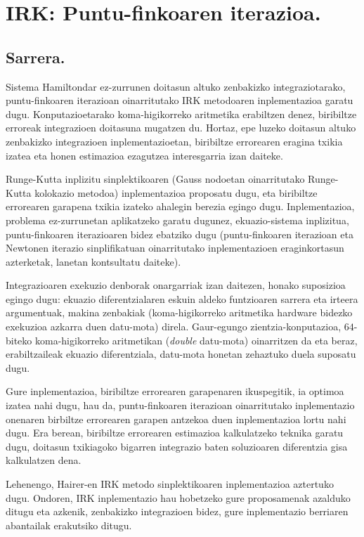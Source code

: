 \chapter{IRK: Puntu-finkoaren iterazioa.}
\label{chap:IRK-PF}

\section{Sarrera.}


Sistema Hamiltondar ez-zurrunen doitasun altuko zenbakizko integraziotarako, puntu-finkoaren iterazioan oinarritutako IRK metodoaren inplementazioa garatu dugu. Konputazioetarako koma-higikorreko aritmetika erabiltzen denez, biribiltze erroreak integrazioen doitasuna mugatzen du. Hortaz, epe luzeko doitasun altuko zenbakizko integrazioen inplementazioetan, biribiltze errorearen eragina txikia izatea eta honen estimazioa ezagutzea interesgarria izan daiteke. 

Runge-Kutta inplizitu sinplektikoaren (Gauss nodoetan oinarritutako Runge-Kutta kolokazio metodoa) inplementazioa proposatu dugu, eta biribiltze errorearen garapena txikia izateko ahalegin berezia egingo dugu. Inplementazioa, problema ez-zurrunetan aplikatzeko garatu dugunez, ekuazio-sistema inplizitua, puntu-finkoaren iterazioaren bidez ebatziko dugu (puntu-finkoaren iterazioan eta Newtonen iterazio sinplifikatuan oinarritutako inplementazioen eraginkortasun azterketak, \cite{Hairer2006,JMSanz-Serna1994} lanetan kontsultatu daiteke).

Integrazioaren exekuzio denborak onargarriak izan daitezen, honako suposizioa egingo dugu: ekuazio diferentzialaren eskuin aldeko funtzioaren sarrera eta irteera argumentuak, makina zenbakiak (koma-higikorreko aritmetika hardware bidezko exekuzioa azkarra duen datu-mota) direla. Gaur-egungo zientzia-konputazioa,  $64$-biteko koma-higikorreko aritmetikan (\emph{double} datu-mota) oinarritzen da eta beraz, erabiltzaileak ekuazio diferentziala, datu-mota honetan zehaztuko duela suposatu dugu.

Gure inplementazioa, biribiltze errorearen garapenaren ikuspegitik, ia optimoa izatea nahi dugu, hau da, puntu-finkoaren iterazioan oinarritutako inplementazio onenaren birbiltze errorearen garapen antzekoa duen inplementazioa lortu nahi dugu. Era berean, biribiltze errorearen estimazioa kalkulatzeko teknika garatu dugu, doitasun txikiagoko bigarren integrazio baten soluzioaren diferentzia gisa kalkulatzen dena. 
 
 
Lehenengo, Hairer-en IRK metodo sinplektikoaren inplementazioa  \cite{Hairer2008} aztertuko dugu. Ondoren, IRK inplementazio hau hobetzeko gure proposamenak azalduko ditugu eta azkenik, zenbakizko integrazioen bidez, gure inplementazio berriaren abantailak erakutsiko ditugu.

